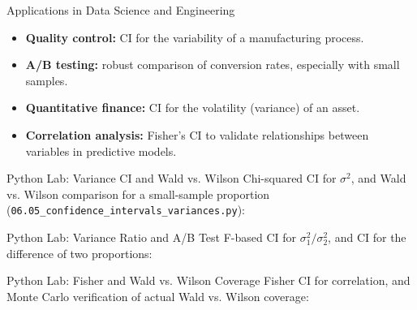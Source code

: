 \documentclass[aspectratio=169,xcolor={dvipsnames,table}]{beamer}
\begin{document}
\begin{frame}{Applications in Data Science and Engineering}
	\vspace{-0.1cm}
	\begin{itemize}\itemsep=0.1cm
		\item \textbf{Quality control:} CI for the variability of a manufacturing process. \pause
		\item \textbf{A/B testing:} robust comparison of conversion rates, especially with small samples. \pause
		\item \textbf{Quantitative finance:} CI for the volatility (variance) of an asset. \pause
		\item \textbf{Correlation analysis:} Fisher's CI to validate relationships between variables in predictive models.
	\end{itemize}
\end{frame}

\begin{frame}[fragile]{Python Lab: Variance CI and Wald vs. Wilson}
	\vspace{-0.05cm}
	\scriptsize
	Chi-squared CI for $\sigma^2$, and Wald vs. Wilson comparison for a small-sample proportion (\texttt{06.05\_confidence\_intervals\_variances.py}):
	{
	}
\end{frame}

\begin{frame}[fragile]{Python Lab: Variance Ratio and A/B Test}
	\vspace{-0.05cm}
	\scriptsize
	F-based CI for $\sigma_1^2/\sigma_2^2$, and CI for the difference of two proportions:
	{
	}
\end{frame}

\begin{frame}[fragile]{Python Lab: Fisher and Wald vs. Wilson Coverage}
	\vspace{-0.05cm}
	\scriptsize
	Fisher CI for correlation, and Monte Carlo verification of actual Wald vs. Wilson coverage:
	{
	}
\end{frame}
\end{document}
